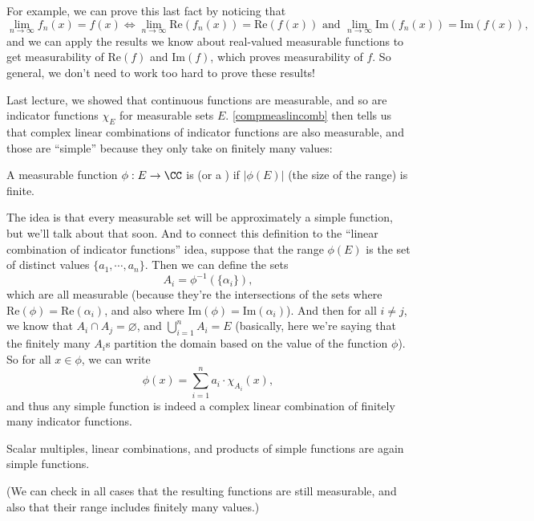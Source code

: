 For example, we can prove this last fact by noticing that 
\[
    \lim_{n \to \infty} f_n(x) = f(x) \iff \lim_{n \to \infty} \text{Re}(f_n(x)) = \text{Re}(f(x)) \text{ and } \lim_{n \to \infty} \text{Im}(f_n(x)) = \text{Im}(f(x)),
\]  
and we can apply the results we know about real-valued measurable functions to get measurability of $\text{Re}(f)$ and $\text{Im}(f)$, which proves measurability of $f$. So general, we don't need to work too hard to prove these results!

Last lecture, we showed that continuous functions are measurable, and so are indicator functions $\chi_E$ for measurable sets $E$. \cref{compmeaslincomb} then tells us that complex linear combinations of indicator functions are also measurable, and those are ``simple'' because they only take on finitely many values:

\begin{definition}
A measurable function $\phi: E \to \CC$ is  (or a ) if $|\phi(E)|$ (the size of the range) is finite.
\end{definition}

The idea is that every measurable set will be approximately a simple function, but we'll talk about that soon. And to connect this definition to the ``linear combination of indicator functions'' idea, suppose that the range $\phi(E)$ is the set of distinct values $\{a_1, \cdots, a_n\}$. Then we can define the sets 
\[
    A_i = \phi^{-1}\left(\{\alpha_i\}\right), 
\]
which are all measurable (because they're the intersections of the sets where $\text{Re}(\phi) = \text{Re}(\alpha_i)$, and also where $\text{Im}(\phi) = \text{Im}(\alpha_i)$). And then for all $i \ne j$, we know that $A_i \cap A_j = \varnothing$, and $\bigcup_{i=1}^n A_i = E$ (basically, here we're saying that the finitely many $A_i$s partition the domain based on the value of the function $\phi$). So for all $x \in \phi$, we can write
\[
    \phi(x) = \sum_{i=1}^n a_i \cdot \chi_{A_i}(x),
\]
and thus any simple function is indeed a complex linear combination of finitely many indicator functions.

\begin{proposition}
Scalar multiples, linear combinations, and products of simple functions are again simple functions.
\end{proposition}

(We can check in all cases that the resulting functions are still measurable, and also that their range includes finitely many values.)

